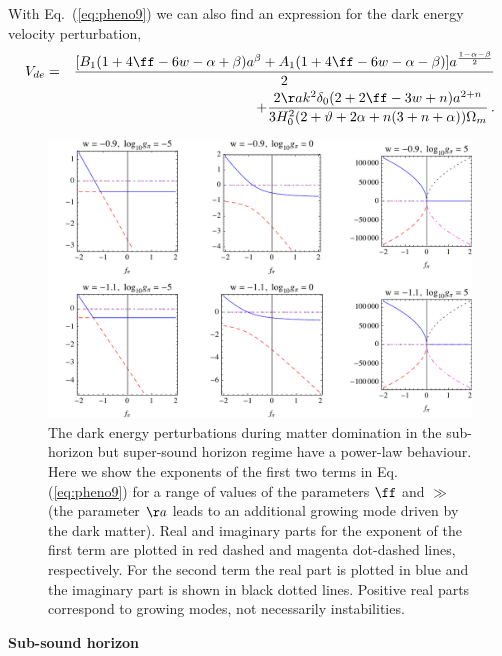 With Eq.\ (\ref{eq:pheno9}) we can also find an expression for the dark energy velocity perturbation,   
\begin{eqnarray} 
V_{de} & = & \frac{[B_1 (1+ 4\ff - 6w - \alpha + \beta) a^\beta + A_1 (1+4\ff -6w-\alpha - \beta) ] a^{\frac{1-\alpha - \beta}{2}} }{2} \nonumber \\
&&+ \frac{2 \aa k^2 \delta_0 (2+2\ff -3w + n)a^{2+n}}{3 H_0^2 (2+\vartheta + 2\alpha +n(3+n+\alpha))\Omega_m} \, .
\label{eq:pheno9b}
\end{eqnarray}

\begin{figure}[tb]
\centering
\includegraphics[width=.9\textwidth]{figures/chapter-ade/expogrid1.pdf}
\caption{The dark energy perturbations during matter domination in the sub-horizon but super-sound horizon regime have a power-law behaviour. Here we show the exponents of the first two terms in Eq. (\ref{eq:pheno9}) for a range of values of the parameters $\ff$ and $\gg$ (the parameter $\aa$ leads to an additional growing mode
driven by the dark matter). Real and imaginary parts for the exponent of the first term are plotted in red dashed and magenta dot-dashed lines, respectively. For the second term the real part is plotted in blue and the imaginary part is shown in black dotted lines. Positive real parts correspond to growing modes, not necessarily instabilities.}
\label{fig:expogrid1}
\end{figure}

\noindent\textbf{Sub-sound horizon}\\

